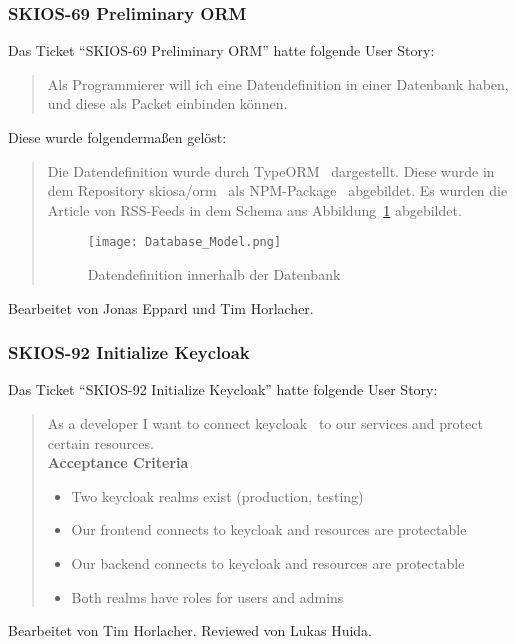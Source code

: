 \subsubsection{SKIOS-69 Preliminary ORM}
Das Ticket \enquote{SKIOS-69 Preliminary ORM} hatte folgende User Story:
\begin{quotation}
    Als Programmierer will ich eine Datendefinition in einer Datenbank
    haben, und diese als Packet einbinden können.
\end{quotation}
Diese wurde folgendermaßen gelöst:
\begin{quotation}
Die Datendefinition wurde durch TypeORM~\parencite{web/TypeORM} dargestellt.
Diese wurde in dem Repository skiosa/orm~\parencite{git/skiosa/orm} als NPM-Package~\parencite{web/npm} abgebildet.
Es wurden die Article von RSS-Feeds in dem Schema aus Abbildung~\ref{fig:databaseORM} abgebildet.
\begin{figure}
    \texttt{[image: Database\_Model.png]}
    \caption{Datendefinition innerhalb der Datenbank}
    \label{fig:databaseORM}
\end{figure}
\end{quotation}
Bearbeitet von Jonas Eppard und Tim Horlacher.

\subsubsection{SKIOS-92 Initialize Keycloak}
Das Ticket \enquote{SKIOS-92 Initialize Keycloak} hatte folgende User Story:
\begin{quotation}
    As a developer I want to connect keycloak~\parencite{web/Keycloak} to our services and protect certain resources. \\
    \textbf{Acceptance Criteria}
    \begin{itemize}
        \item Two keycloak realms exist (production, testing)
        \item Our frontend connects to keycloak and resources are protectable
        \item Our backend connects to keycloak and resources are protectable
        \item Both realms have roles for users and admins
    \end{itemize}
\end{quotation}
Bearbeitet von Tim Horlacher.
Reviewed von Lukas Huida.

